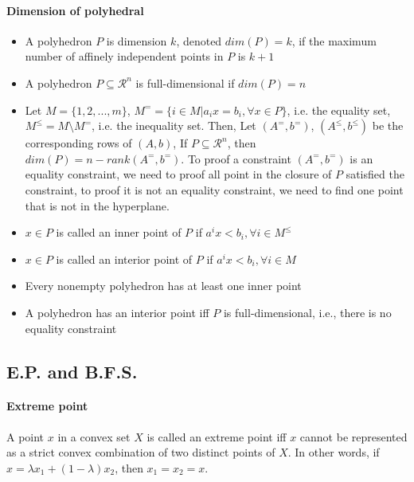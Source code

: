                 \paragraph{Dimension of polyhedral}
                    \begin{itemize}
                        \item A polyhedron $P$ is dimension $k$, denoted $dim(P)=k$, if the maximum number of affinely independent points in $P$ is $k+1$
                        \item A polyhedron $P\subseteq \mathcal{R}^n$ is full-dimensional if $dim(P) = n$
                        \item Let $M=\{1, 2, ..., m\}$, $M^= = \{i \in M | a_ix=b_i, \forall x \in P\}$, i.e. the equality set, $M^\le = M \setminus  M^=$, i.e. the inequality set. Then, Let $(A^=, b^=)$, $(A^\le, b^\le)$ be the corresponding rows of $(A, b)$, If $P\subseteq \mathcal{R}^n$, then $dim(P) = n - rank(A^=, b^=)$. To proof a constraint $(A^=, b^=)$ is an equality constraint, we need to proof all point in the closure of $P$ satisfied the constraint, to proof it is not an equality constraint, we need to find one point that is not in the hyperplane.
                        \item $x\in P$ is called an inner point of $P$ if $a^ix < b_i, \forall i \in M^\le$
                        \item $x\in P$ is called an interior point of $P$ if $a^ix < b_i, \forall i \in M$
                        \item Every nonempty polyhedron has at least one inner point
                        \item A polyhedron has an interior point iff $P$ is full-dimensional, i.e., there is no equality constraint
                    \end{itemize}

            \subsection{E.P. and B.F.S.}
                \paragraph{Extreme point}
                    A point $x$ in a convex set $X$ is called an extreme point iff $x$ cannot be represented as a strict convex combination of two distinct points of $X$. In other words, if $x = \lambda x_1 + (1 - \lambda) x_2$, then $x_1 = x_2 = x$.

